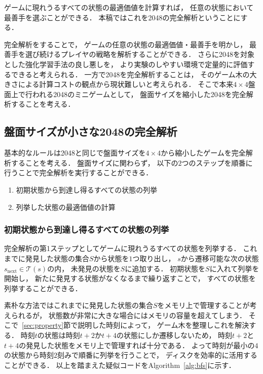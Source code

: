 ゲームに現れうるすべての状態の最適価値を計算すれば， 任意の状態において最善手を選ぶことができる．
本稿ではこれを2048の完全解析ということにする．

完全解析をすることで， ゲームの任意の状態の最適価値・最善手を明かし， 最善手を選び続けるプレイヤの戦略を解析することができる．
さらに2048を対象とした強化学習手法の良し悪しを， より実験のしやすい環境で定量的に評価するできると考えられる．
一方で2048を完全解析することは， そのゲーム木の大きさによる計算コストの観点から現状難しいと考えられる．
そこで本来$4\times4$盤面上で行われる2048のミニゲームとして， 盤面サイズを縮小した2048を完全解析することを考える．

\subsection{盤面サイズが小さな2048の完全解析}
\label{sec:mini2048}
基本的なルールは2048と同じで盤面サイズを$4\times4$から縮小したゲームを完全解析することを考える．
盤面サイズに関わらず， 以下の$2$つのステップを順番に行うことで完全解析を実行することができる．
\begin{enumerate}
    \item 初期状態から到達し得るすべての状態の列挙
    \item 列挙した状態の最適価値の計算
\end{enumerate}

\subsubsection{初期状態から到達し得るすべての状態の列挙}
\label{subsec:enumeration}
完全解析の第1ステップとしてゲームに現れうるすべての状態を列挙する．
これまでに発見した状態の集合$S$から状態を$1$つ取り出し， $s$から遷移可能な次の状態$s_{\text{next}} \in \mathcal{T}(s)$の内， 未発見の状態を$S$に追加する．
初期状態を$S$に入れて列挙を開始し， 新たに発見する状態がなくなるまで繰り返すことで， すべての状態を列挙することができる．

素朴な方法ではこれまでに発見した状態の集合$S$をメモリ上で管理することが考えられるが， 状態数が非常に大きな場合にはメモリの容量を超えてしまう．
そこで~\ref{sec:property}節で説明した時刻によって， ゲーム木を整理しこれを解決する．
時刻$t$の状態は時刻$t+2$か$t+4$の状態にしか遷移しないため， 時刻$t+2$と$t+4$の発見した状態をメモリ上で管理すれば十分である．
よって時刻が最小の$4$の状態から時刻$2$刻みで順番に列挙を行うことで， ディスクを効率的に活用することができる．
以上を踏まえた疑似コードをAlgorithm~\ref{alg:bfs}に示す．

